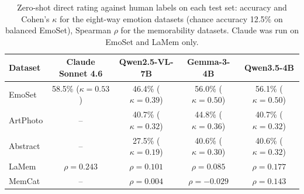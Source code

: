 \begin{table}[t]
\centering
\caption{Zero-shot direct rating against human labels on each test set: accuracy and Cohen's $\kappa$ for the eight-way emotion datasets (chance accuracy 12.5\% on balanced EmoSet), Spearman $\rho$ for the memorability datasets. Claude was run on EmoSet and LaMem only.}
\label{tab:direct}
\footnotesize\setlength{\tabcolsep}{4pt}
\begin{tabular}{@{}lcccc@{}}
\toprule
Dataset & Claude Sonnet 4.6 & Qwen2.5-VL-7B & Gemma-3-4B & Qwen3.5-4B \\
\midrule
EmoSet & 58.5\% ($\kappa = 0.53$) & 46.4\% ($\kappa = 0.39$) & 56.0\% ($\kappa = 0.50$) & 56.1\% ($\kappa = 0.50$) \\
ArtPhoto & -- & 40.7\% ($\kappa = 0.32$) & 44.8\% ($\kappa = 0.36$) & 40.7\% ($\kappa = 0.32$) \\
Abstract & -- & 27.5\% ($\kappa = 0.19$) & 40.6\% ($\kappa = 0.30$) & 40.6\% ($\kappa = 0.32$) \\
LaMem & $\rho = 0.243$ & $\rho = 0.101$ & $\rho = 0.085$ & $\rho = 0.177$ \\
MemCat & -- & $\rho = 0.004$ & $\rho = -0.029$ & $\rho = 0.143$ \\
\bottomrule
\end{tabular}
\end{table}
